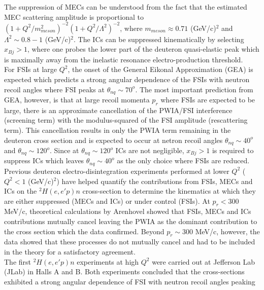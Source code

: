 The suppression of MECs can be understood from the fact that the estimated MEC scattering amplitude is proportional to  $(1 + Q^{2}/m^{2}_{meson})^{-2}(1+Q^{2}/\Lambda^{2})^{-2}$, where $m_{meson}\approx0.71$ (GeV/c)$^{2}$ and
$\Lambda^{2}\sim 0.8-1 $ (GeV/c)$^{2}$\cite{Sargsian_2001}. The ICs can be suppressed kinematically by selecting $x_{Bj}>1$, where one probes the lower part of the deuteron quasi-elastic peak which is maximally away from the inelastic resonance
electro-production threshold. \\
\indent For FSIs at large $Q^{2}$, the onset of the General Eikonal Approximation (GEA)\cite{Sargsian_2001,PhysRevC.56.1124,sargsian_2015} is expected which predicts a strong angular dependence of the FSIs with neutron recoil angles where FSI peaks at $\theta_{nq}\sim70^{o}$. The
most important prediction from GEA, however, is that at large recoil momenta $p_{r}$ where FSIs are expected to be large, there is an approximate cancellation of the PWIA/FSI interference (screening term) with the
modulus-squared of the FSI amplitude (rescattering term). This cancellation results in only the PWIA term remaining in the deuteron cross section and is expected to occur at netron recoil angles $\theta_{nq}\sim40^{o}$ and $\theta_{nq}\sim120^{o}$. Since at $\theta_{nq}\sim120^{o}$ ICs are not negligible, $x_{Bj}>1$ is required to suppress ICs which leaves $\theta_{nq}\sim40^{o}$ as the only choice where FSIs are reduced. \\
\indent Previous deuteron electro-disintegration experiments performed at lower $Q^{2}$ ($Q^{2}<1$ (GeV/c)$^{2}$)\cite{sargsian_2015} have helped quantify the contributions from FSIs, MECs and ICs on
the $^{2}H(e,e'p)n$ cross-section to determine the kinematics at which they are either suppressed (MECs and ICs) or under control (FSIs).  At $p_{r}<300$ MeV/c, theoretical
calculations by Arenhovel\cite{Arenhovel_1976} showed that FSIs, MECs and ICs contributions mutually cancel leaving the PWIA as the dominant contribution to the cross section which
the data confirmed. Beyond $p_{r}\sim300$ MeV/c, however, the data showed that these processes do not mutually cancel and had to be included in the theory for a satisfactory agreement. \\
\indent The first $^{2}H(e,e'p)n$ experiments at high $Q^{2}$ were carried out at Jefferson Lab (JLab) in Halls A\cite{PhysRevLett.89.062301} and B\cite{PhysRevLett.98.262502}. Both
experiments concluded that the cross-sections exhibited a strong angular dependence of FSI with neutron recoil angles peaking
